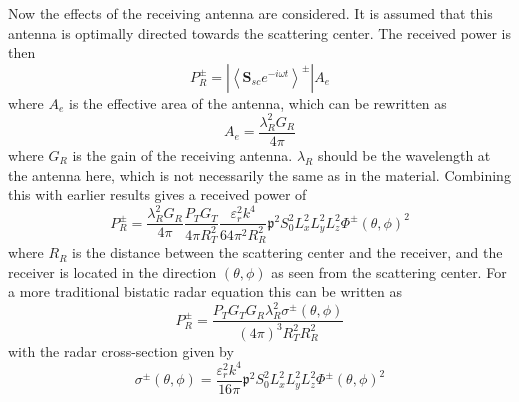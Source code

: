\documentclass[11pt,twoside]{eitExjobb}
\begin{document}
	Now the effects of the receiving antenna are considered. It is assumed that this antenna is optimally directed towards the scattering center. The received power is then
	\begin{equation*}
		P_R^\pm = \left| \left< \bm{S}_{sc} e^{-i\omega t} \right>^\pm \right| A_e
	\end{equation*}
	where $A_e$ is the effective area of the antenna, which can be rewritten as
	\begin{equation*}
		A_e = \frac{\lambda_R^2 G_R}{4\pi}
	\end{equation*}
	where $G_R$ is the gain of the receiving antenna. $\lambda_R$ should be the wavelength at the antenna here, which is not necessarily the same as in the material. Combining this with earlier results gives a received power of
	\begin{equation*}
		P_R^\pm = \frac{\lambda_R^2 G_R}{4\pi} \frac{P_T G_T}{4\pi R_T^2} \frac{\varepsilon_r^2 k^4}{64 \pi^2 R_R^2} \mathfrak{p}^2 S_0^2 L_x^2 L_y^2 L_z^2 \Phi^\pm (\theta,\phi)^2
	\end{equation*}
	where $R_R$ is the distance between the scattering center and the receiver, and the receiver is located in the direction $(\theta,\phi)$ as seen from the scattering center. For a more traditional bistatic radar equation this can be written as
	\begin{equation*}
		P_R^\pm = \frac{P_T G_T G_R \lambda_R^2 \sigma^\pm (\theta,\phi)}{(4\pi)^3 R_T^2 R_R^2}
	\end{equation*}
	with the radar cross-section given by
	\begin{equation*}
		\sigma^\pm (\theta, \phi) = \frac{\varepsilon_r^2 k^4}{16\pi} \mathfrak{p}^2 S_0^2 L_x^2 L_y^2 L_z^2 \Phi^\pm (\theta,\phi)^2
	\end{equation*}
	
\end{document}
